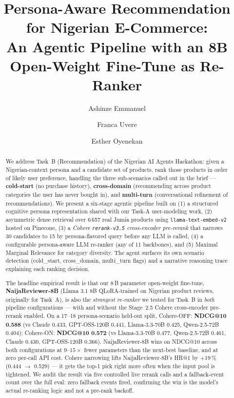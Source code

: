 \documentclass[sigconf,nonacm,balance]{acmart}
\title{Persona-Aware Recommendation for Nigerian E-Commerce:\\
       An Agentic Pipeline with an 8B Open-Weight Fine-Tune as Re-Ranker}
\author{Ashinze Emmanuel}
\affiliation{\institution{International University of Applied Sciences}\country{Germany}}
\author{Franca Uvere}
\affiliation{\institution{University of Lagos}\country{Nigeria}}
\author{Esther Oyenekan}
\affiliation{\institution{MIVA Open University}\country{Nigeria}}
\begin{document}
\begin{abstract}
We address Task~B (Recommendation) of the Nigerian AI Agents Hackathon:
given a Nigerian-context persona and a candidate set of products, rank
those products in order of likely user preference, handling the three
sub-scenarios called out in the brief --- \textbf{cold-start}
(no purchase history), \textbf{cross-domain} (recommending across product
categories the user has never bought in), and \textbf{multi-turn}
(conversational refinement of recommendations). We present a six-stage
agentic pipeline built on (1) a structured cognitive persona
representation shared with our Task-A user-modeling work,
(2) asymmetric dense retrieval over 6\,657 real Jumia products using
\texttt{llama-text-embed-v2} hosted on Pinecone, (3) a
\emph{Cohere \texttt{rerank-v3.5} cross-encoder pre-rerank} that narrows
30 candidates to 15 by persona-flavored query before any LLM is called,
(4) a configurable persona-aware LLM re-ranker (any of 11 backbones),
and (5) Maximal Marginal Relevance for category diversity. The agent surfaces its own scenario detection
(\textsf{cold\_start}, \textsf{cross\_domain}, \textsf{multi\_turn} flags)
and a narrative reasoning trace explaining each ranking decision.

The headline empirical result is that our 8\,B parameter open-weight
fine-tune, \textbf{NaijaReviewer-8B} (Llama 3.1 8B QLoRA-trained on
Nigerian product reviews, originally for Task~A), is also the
\emph{strongest re-ranker} we tested for Task~B in \emph{both}
pipeline configurations --- with and without the Stage~2.5 Cohere
cross-encoder pre-rerank enabled. On a 17--18 persona-scenario
held-out split, Cohere-OFF: \textbf{NDCG@10 0.588} (vs Claude 0.433,
GPT-OSS-120B 0.441, Llama-3.3-70B 0.425, Qwen-2.5-72B 0.404);
Cohere-ON: \textbf{NDCG@10 0.572} (vs Llama-3.3-70B 0.477,
Qwen-2.5-72B 0.461, Claude 0.430, GPT-OSS-120B 0.366). NaijaReviewer-8B
wins on NDCG@10 across both configurations at $9$--$15\times$ fewer
parameters than the next-best baseline, and at zero per-call API cost.
Cohere narrowing lifts NaijaReviewer-8B's HR@1 by $+$19\,\% (0.444
$\to$ 0.529) --- it gets the top-1 pick right more often when the
input pool is tightened. We audit the result via five controlled
live rerank calls and a fallback-event count over the full eval: zero
fallback events fired, confirming the win is the model's actual
re-ranking logic and not a pre-rank backoff.
\end{abstract}

\maketitle
\end{document}
